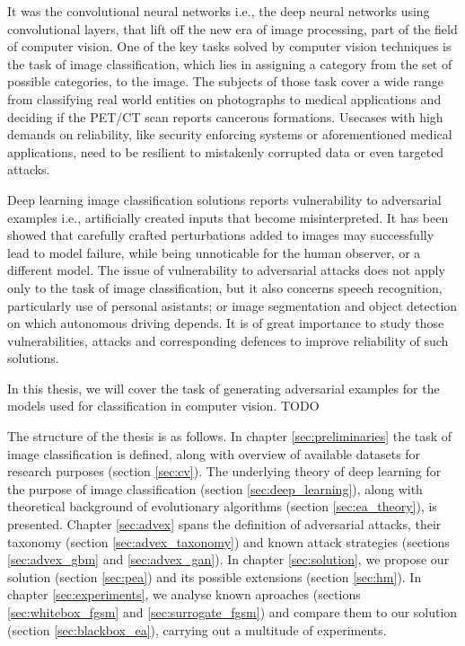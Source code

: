 It was the convolutional neural networks i.e., the deep neural networks using convolutional layers, that lift off the new era of image processing, part of the field of computer vision. One of the key tasks solved by computer vision techniques is the task of image classification, which lies in assigning a category from the set of possible categories, to the image. The subjects of those task cover a wide range from classifying real world entities on photographs to medical applications and deciding if the PET/CT scan reports cancerous formations. Usecases with high demands on reliability, like security enforcing systems or aforementioned medical applications, need to be resilient to mistakenly corrupted data or even targeted attacks.

Deep learning image classification solutions reports vulnerability to adversarial examples i.e., artificially created inputs that become misinterpreted. It has been showed that carefully crafted perturbations added to images may successfully lead to model failure, while being unnoticable for the human observer, or a different model. The issue of vulnerability to adversarial attacks does not apply only to the task of image classification, but it also concerns speech recognition, particularly use of personal asistants; or image segmentation and object detection on which autonomous driving depends. It is of great importance to study those vulnerabilities, attacks and corresponding defences to improve reliability of such solutions.

In this thesis, we will cover the task of generating adversarial examples for the models used for classification in computer vision. TODO

The structure of the thesis is as follows. In chapter \ref{sec:preliminaries} the task of image classification is defined, along with overview of available datasets for research purposes (section \ref{sec:cv}). The underlying theory of deep learning for the purpose of image classification (section \ref{sec:deep_learning}), along with theoretical background of evolutionary algorithms (section \ref{sec:ea_theory}), is presented. Chapter \ref{sec:advex} spans the definition of adversarial attacks, their taxonomy (section \ref{sec:advex_taxonomy}) and known attack strategies (sections \ref{sec:advex_gbm} and \ref{sec:advex_gan}). In chapter \ref{sec:solution}, we propose our solution (section \ref{sec:pea}) and its possible extensions (section \ref{sec:hm}). In chapter \ref{sec:experiments}, we analyse known aproaches (sections \ref{sec:whitebox_fgsm} and \ref{sec:surrogate_fgsm}) and compare them to our solution (section \ref{sec:blackbox_ea}), carrying out a multitude of experiments.





